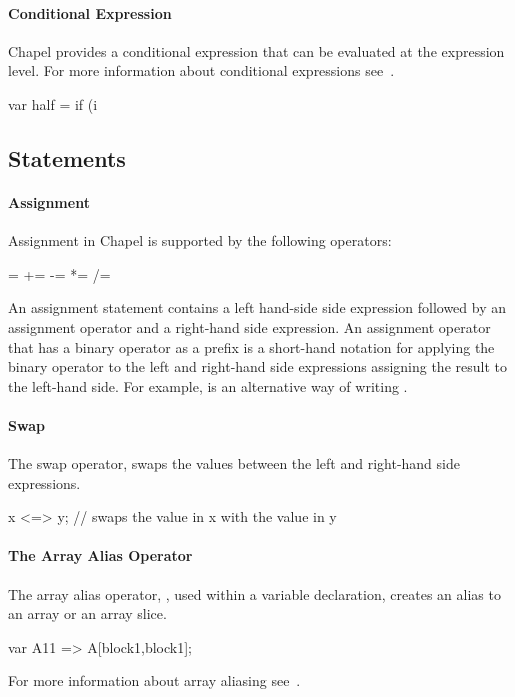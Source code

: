 \paragraph{Conditional Expression} 
Chapel provides a conditional expression that can be evaluated
at the expression level.  For more information about conditional
expressions see~.

\begin{example}
\begin{chapel}
var half = if (i %
\end{chapel}
\end{example}

\subsection{Statements}

\paragraph{Assignment}
Assignment in Chapel is supported by the following operators:
\begin{chapel}
 = += -= *= /= %
\end{chapel}

An assignment statement contains a left hand-side side expression
followed by an assignment operator and a right-hand side expression.
An assignment operator that has a binary operator as a prefix is a
short-hand notation for applying the binary operator to the left and
right-hand side expressions assigning the result to the left-hand
side.  For example,
 is an alternative way of writing .

\paragraph{Swap}
The swap operator, \chpl{<=>} swaps the values between
the left and right-hand side expressions.
\begin{chapel}
x <=> y; // swaps the value in x with the value in y
\end{chapel}

\paragraph{The Array Alias Operator}
The array alias operator, \chpl{=>}, used within a
variable declaration, creates an alias to an array or 
an array slice.  
\begin{chapel}
var A11 => A[block1,block1];
\end{chapel}
For more information about array aliasing see~.


